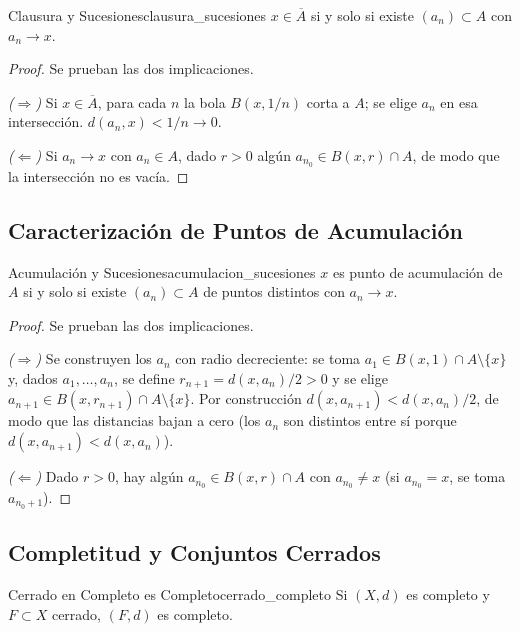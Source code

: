 \documentclass[11pt, a4paper]{article}
\begin{document}
\begin{proposicion}{Clausura y Sucesiones}{clausura_sucesiones}
$x \in \overline{A}$ si y solo si existe $(a_n) \subset A$ con $a_n \to x$.
\end{proposicion}

\begin{proof}
Se prueban las dos implicaciones.

\textit{($\Rightarrow$)} Si $x \in \overline{A}$, para cada $n$ la bola $B(x, 1/n)$ corta a $A$; se
elige $a_n$ en esa intersección. $d(a_n, x) < 1/n \to 0$.

\textit{($\Leftarrow$)} Si $a_n \to x$ con $a_n \in A$, dado $r > 0$ algún $a_{n_0} \in B(x, r) \cap A$,
de modo que la intersección no es vacía.
\end{proof}

\subsection{Caracterización de Puntos de Acumulación}

\begin{proposicion}{Acumulación y Sucesiones}{acumulacion_sucesiones}
$x$ es punto de acumulación de $A$ si y solo si existe $(a_n) \subset A$ de puntos distintos con
$a_n \to x$.
\end{proposicion}

\begin{proof}
Se prueban las dos implicaciones.

\textit{($\Rightarrow$)} Se construyen los $a_n$ con radio decreciente: se toma
$a_1 \in B(x, 1) \cap A \setminus \{x\}$ y, dados $a_1, \dots, a_n$, se define
$r_{n+1} = d(x, a_n)/2 > 0$ y se elige $a_{n+1} \in B(x, r_{n+1}) \cap A \setminus \{x\}$. Por
construcción $d(x, a_{n+1}) < d(x, a_n)/2$, de modo que las distancias bajan a cero (los $a_n$ son
distintos entre sí porque $d(x, a_{n+1}) < d(x, a_n)$).

\textit{($\Leftarrow$)} Dado $r > 0$, hay algún $a_{n_0} \in B(x, r) \cap A$ con $a_{n_0} \ne x$ (si
$a_{n_0} = x$, se toma $a_{n_0+1}$).
\end{proof}

\subsection{Completitud y Conjuntos Cerrados}

\begin{proposicion}{Cerrado en Completo es Completo}{cerrado_completo}
Si $(X, d)$ es completo y $F \subset X$ cerrado, $(F, d)$ es completo.
\end{proposicion}
\end{document}

